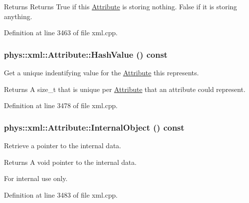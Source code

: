 \begin{DoxyReturn}{Returns}
Returns True if this \hyperlink{classphys_1_1xml_1_1Attribute}{Attribute} is storing nothing. False if it is storing anything. 
\end{DoxyReturn}


Definition at line 3463 of file xml.cpp.

\hypertarget{classphys_1_1xml_1_1Attribute_ac0c27e07b705c41670a0903f4fe18378}{
\subsubsection[{HashValue}]{\setlength{\rightskip}{0pt plus 5cm}phys::xml::Attribute::HashValue () const}}
\label{da/ddf/classphys_1_1xml_1_1Attribute_ac0c27e07b705c41670a0903f4fe18378}


Get a unique indentifying value for the \hyperlink{classphys_1_1xml_1_1Attribute}{Attribute} this represents. 

\begin{DoxyReturn}{Returns}
A size\_\-t that is unique per \hyperlink{classphys_1_1xml_1_1Attribute}{Attribute} that an attribute could represent. 
\end{DoxyReturn}


Definition at line 3478 of file xml.cpp.

\hypertarget{classphys_1_1xml_1_1Attribute_a1354d5f93309a999651e11b1cd4c2f62}{
\subsubsection[{InternalObject}]{\setlength{\rightskip}{0pt plus 5cm}phys::xml::Attribute::InternalObject () const}}
\label{da/ddf/classphys_1_1xml_1_1Attribute_a1354d5f93309a999651e11b1cd4c2f62}


Retrieve a pointer to the internal data. 

\begin{DoxyReturn}{Returns}
A void pointer to the internal data. 
\end{DoxyReturn}
\begin{DoxyInternal}{For internal use only.}
\end{DoxyInternal}


Definition at line 3483 of file xml.cpp.


